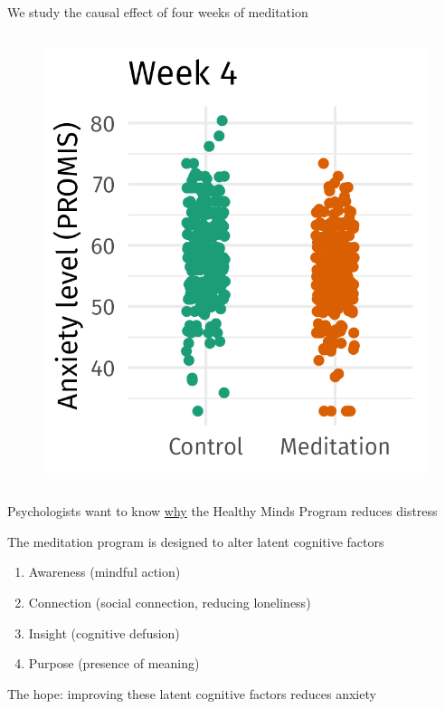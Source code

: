 \documentclass[aspectratio=169]{beamer}
\theoremstyle{remark}
\begin{document}
\begin{frame}{We study the causal effect of four weeks of meditation}
\begin{columns}
        \centering
        \begin{figure}[ht]
            \includegraphics{figures/week4_scatter.png}
            \centering
        \end{figure}
    \end{columns}
\end{frame}

\begin{frame}{Psychologists want to know \underline{why} the Healthy Minds Program reduces distress}

    The meditation program is designed to alter latent cognitive factors

    \begin{enumerate}
        \item Awareness (mindful action)
        \item Connection (social connection, reducing loneliness)
        \item Insight (cognitive defusion)
        \item Purpose (presence of meaning)
    \end{enumerate}

    The hope: improving these latent cognitive factors reduces anxiety
\end{frame}
\end{document}
